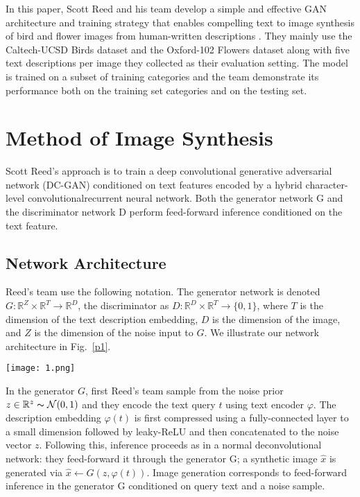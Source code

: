\documentclass[10pt,twocolumn,letterpaper]{article}
\begin{document}
In this paper, Scott Reed and his team develop a simple and effective GAN architecture and training strategy that enables compelling text to image synthesis of bird and flower images from human-written descriptions \cite{reed2016generative}. They mainly use the Caltech-UCSD Birds dataset and the Oxford-102 Flowers dataset along with five text descriptions per image they collected as their evaluation setting. The model is trained on a subset of training categories and the team demonstrate its performance both on the training set categories and on the testing set.

\section{Method of Image Synthesis}

Scott Reed's approach is to train a deep convolutional generative adversarial network (DC-GAN) conditioned on text features encoded by a hybrid character-level convolutionalrecurrent neural network. Both the generator network G and the discriminator network D perform feed-forward inference conditioned on the text feature.

\subsection{Network Architecture}

Reed's team use the following notation. The generator network is denoted $G : \mathbb{R}^Z\times \mathbb{R}^T\to \mathbb{R}^D$, the discriminator as $D : \mathbb{R}^D\times \mathbb{R}^T\to \{0,1\}$, where $T$ is the dimension of the text description embedding, $D$ is the dimension of the image, and $Z$ is the dimension of the noise input to $G$. We illustrate our network architecture in Fig.~\ref{p1}.
\begin{figure*}
	\begin{center}
		\texttt{[image: 1.png]}
	\end{center}
	\caption{The text-conditional convolutional GAN architecture. Text encoding $\varphi(t)$ is used by both generator and discriminator. It is projected to a lower-dimensions and depth concatenated with image feature maps for further stages of convolutional processing.}
	\label{p1}
\end{figure*}

In the generator $G$, first Reed's team sample from the noise prior $z\in \mathbb{R}^z\thicksim \mathcal{N}(0,1)$ and they encode the text query $t$ using text encoder $\varphi$. The description embedding $\varphi(t)$ is first compressed using a fully-connected layer to a small dimension followed by leaky-ReLU and then concatenated to the noise vector $z$. Following this, inference proceeds as in a normal deconvolutional network: they feed-forward it through the generator G; a synthetic image $\hat{x}$ is generated via $\hat{x}\gets G(z,\varphi(t))$. Image generation corresponds to feed-forward inference in the generator G conditioned on query text and a noise sample.
\end{document}
